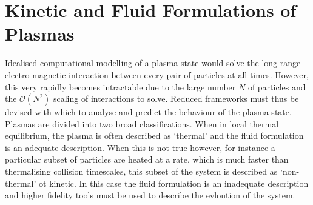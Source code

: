 \section{Kinetic and Fluid Formulations of Plasmas}%
\label{sec:theory_kin_fluid_plasmas}

Idealised computational modelling of a plasma state would solve the long-range electro-magnetic interaction between every pair of particles at all times.
However, this very rapidly becomes intractable due to the large number $N$ of particles and the $\mathcal{O}(N^2)$ scaling of interactions to solve.
Reduced frameworks must thus be devised with which to analyse and predict the behaviour of the plasma state.
Plasmas are divided into two broad classifications.
When in local thermal equilibrium, the plasma is often described as `thermal' and the fluid formulation is an adequate description.
When this is not true however, for instance a particular subset of particles are heated at a rate, which is much faster than thermalising collision timescales, this subset of the system is described as `non-thermal' ot kinetic.
In this case the fluid formulation is an inadequate description and higher fidelity tools must be used to describe the evloution of the system.

